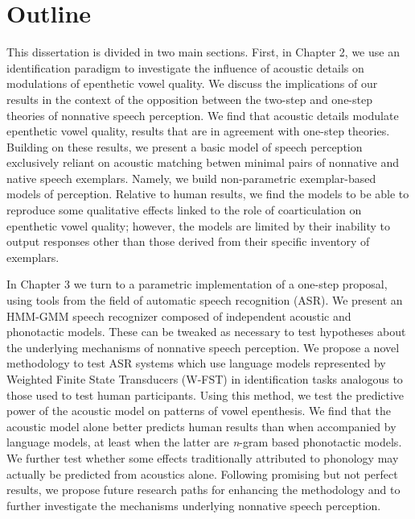 \section{Outline}

This dissertation is divided in two main sections. First, in Chapter 2, we use an identification paradigm to investigate the influence of acoustic details on modulations of epenthetic vowel quality. We discuss the implications of our results in the context of the opposition between the two-step and one-step theories of nonnative speech perception. We find that acoustic details modulate epenthetic vowel quality, results that are in agreement with one-step theories. Building on these results, we present a basic model of speech perception exclusively reliant on acoustic matching betwen minimal pairs of nonnative and native speech exemplars. Namely, we build non-parametric exemplar-based models of perception. Relative to human results, we find the models to be able to reproduce some qualitative effects linked to the role of coarticulation on epenthetic vowel quality; however, the models are limited by their inability to output responses other than those derived from their specific inventory of exemplars.

In Chapter 3 we turn to a parametric implementation of a one-step proposal, using tools from the field of automatic speech recognition (ASR). We present an HMM-GMM speech recognizer composed of independent acoustic and phonotactic models. These can be tweaked as necessary to test hypotheses about the underlying mechanisms of nonnative speech perception. We propose a novel methodology to test ASR systems which use language models represented by Weighted Finite State Transducers (W-FST) in identification tasks analogous to those used to test human participants. Using this method, we test the predictive power of the acoustic model on patterns of vowel epenthesis. We find that the acoustic model alone better predicts human results than when accompanied by language models, at least when the latter are \textit{n}-gram based phonotactic models. We further test whether some effects traditionally attributed to phonology may actually be predicted from acoustics alone. Following promising but not perfect results, we propose future research paths for enhancing the methodology and to further investigate the mechanisms underlying nonnative speech perception.  